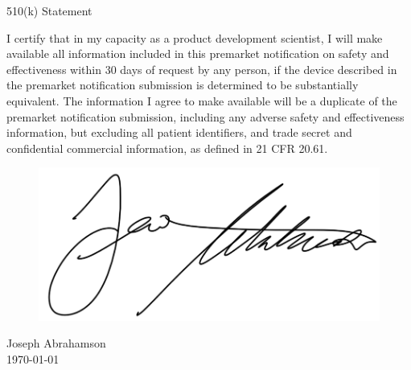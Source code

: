 \newpage
{}
\singlespacing
\begin{center}
  \large{510(k) Statement}
\end{center}

\onehalfspacing


I certify that in my capacity as a product development scientist, I
will make available all information included in this premarket
notification on safety and effectiveness within 30 days of request by
any person, if the device described in the premarket notification
submission is determined to be substantially equivalent. The
information I agree to make available will be a duplicate of the
premarket notification submission, including any adverse safety and
effectiveness information, but excluding all patient identifiers, and
trade secret and confidential commercial information, as defined in 21
CFR 20.61.

\begin{figure}[H]
  \includegraphics[width=0.35\linewidth]{imgs/ja-sig}
\end{figure}

\noindent Joseph Abrahamson \\
\today



